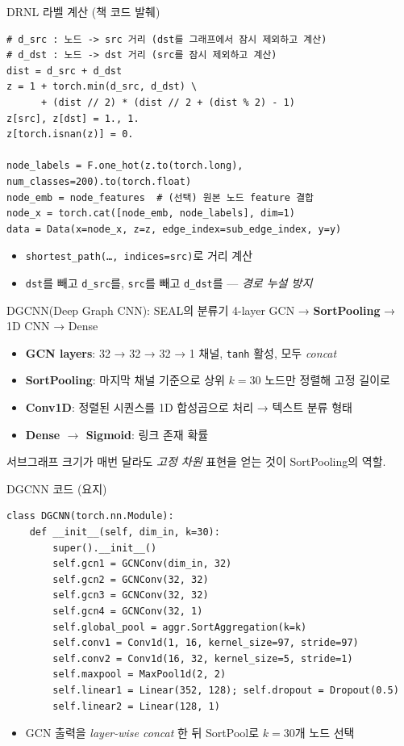 \begin{frame}[fragile]{DRNL 라벨 계산 (책 코드 발췌)}
\begin{lstlisting}
# d_src : 노드 -> src 거리 (dst를 그래프에서 잠시 제외하고 계산)
# d_dst : 노드 -> dst 거리 (src를 잠시 제외하고 계산)
dist = d_src + d_dst
z = 1 + torch.min(d_src, d_dst) \
      + (dist // 2) * (dist // 2 + (dist % 2) - 1)
z[src], z[dst] = 1., 1.
z[torch.isnan(z)] = 0.

node_labels = F.one_hot(z.to(torch.long), num_classes=200).to(torch.float)
node_emb = node_features  # (선택) 원본 노드 feature 결합
node_x = torch.cat([node_emb, node_labels], dim=1)
data = Data(x=node_x, z=z, edge_index=sub_edge_index, y=y)
\end{lstlisting}
\begin{itemize}
  \small
  \item \texttt{shortest\_path(\ldots, indices=src)}로 거리 계산
  \item \texttt{dst}를 빼고 \texttt{d\_src}를, \texttt{src}를 빼고 \texttt{d\_dst}를 — \emph{경로 누설 방지}
\end{itemize}
\end{frame}

\begin{frame}{DGCNN(Deep Graph CNN): SEAL의 분류기}
4-layer GCN → \textbf{SortPooling} → 1D CNN → Dense
\begin{itemize}
  \item \textbf{GCN layers}: 32 → 32 → 32 → 1 채널, \texttt{tanh} 활성, 모두 \emph{concat}
  \item \textbf{SortPooling}: 마지막 채널 기준으로 상위 $k=30$ 노드만 정렬해 고정 길이로
  \item \textbf{Conv1D}: 정렬된 시퀀스를 1D 합성곱으로 처리 → 텍스트 분류 형태
  \item \textbf{Dense $\to$ Sigmoid}: 링크 존재 확률
\end{itemize}
\vspace{0.4em}
서브그래프 크기가 매번 달라도 \emph{고정 차원} 표현을 얻는 것이 SortPooling의 역할.
\end{frame}

\begin{frame}[fragile]{DGCNN 코드 (요지)}
\begin{lstlisting}
class DGCNN(torch.nn.Module):
    def __init__(self, dim_in, k=30):
        super().__init__()
        self.gcn1 = GCNConv(dim_in, 32)
        self.gcn2 = GCNConv(32, 32)
        self.gcn3 = GCNConv(32, 32)
        self.gcn4 = GCNConv(32, 1)
        self.global_pool = aggr.SortAggregation(k=k)
        self.conv1 = Conv1d(1, 16, kernel_size=97, stride=97)
        self.conv2 = Conv1d(16, 32, kernel_size=5, stride=1)
        self.maxpool = MaxPool1d(2, 2)
        self.linear1 = Linear(352, 128); self.dropout = Dropout(0.5)
        self.linear2 = Linear(128, 1)
\end{lstlisting}
\begin{itemize}
  \item GCN 출력을 \emph{layer-wise concat} 한 뒤 SortPool로 $k=30$개 노드 선택
\end{itemize}
\end{frame}

